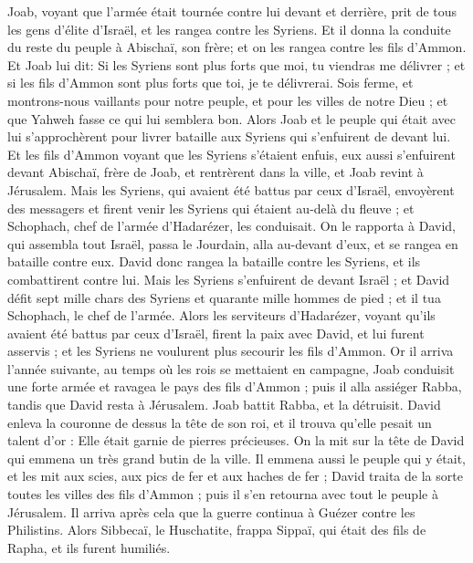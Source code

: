 \begin{multicols}{2}
Joab, voyant que l'armée était tournée contre lui devant et derrière, prit de tous les gens d'élite d'Israël, et les rangea contre les Syriens.
Et il donna la conduite du reste du peuple à Abischaï, son frère; et on les rangea contre les fils d’Ammon.
Et Joab lui dit: Si les Syriens sont plus forts que moi, tu viendras me délivrer ; et si les fils d'Ammon sont plus forts que toi, je te délivrerai.
Sois ferme, et montrons-nous vaillants pour notre peuple, et pour les villes de notre Dieu ; et que Yahweh fasse ce qui lui semblera bon.
Alors Joab et le peuple qui était avec lui s'approchèrent pour livrer bataille aux Syriens qui s'enfuirent de devant lui.
Et les fils d'Ammon voyant que les Syriens s'étaient enfuis, eux aussi s'enfuirent devant Abischaï, frère de Joab, et rentrèrent dans la ville, et Joab revint à Jérusalem.
Mais les Syriens, qui avaient été battus par ceux d'Israël, envoyèrent des messagers et firent venir les Syriens qui étaient au-delà du fleuve ; et Schophach, chef de l'armée d'Hadarézer, les conduisait.
On le rapporta à David, qui assembla tout Israël, passa le Jourdain, alla au-devant d'eux, et se rangea en bataille contre eux. David donc rangea la bataille contre les Syriens, et ils combattirent contre lui.
Mais les Syriens s'enfuirent de devant Israël ; et David défit sept mille chars des Syriens et quarante mille hommes de pied ; et il tua Schophach, le chef de l'armée.
Alors les serviteurs d'Hadarézer, voyant qu'ils avaient été battus par ceux d'Israël, firent la paix avec David, et lui furent asservis ; et les Syriens ne voulurent plus secourir les fils d’Ammon.
\VerseOne{}Or il arriva l’année suivante, au temps où les rois se mettaient en campagne, Joab conduisit une forte armée et ravagea le pays des fils d’Ammon ; puis il alla assiéger Rabba, tandis que David resta à Jérusalem. Joab battit Rabba, et la détruisit.
David enleva la couronne de dessus la tête de son roi, et il trouva qu'elle pesait un talent d'or : Elle était garnie de pierres précieuses. On la mit sur la tête de David qui emmena un très grand butin de la ville.
Il emmena aussi le peuple qui y était, et les mit aux scies, aux pics de fer et aux haches de fer ; David traita de la sorte toutes les villes des fils d’Ammon ; puis il s'en retourna avec tout le peuple à Jérusalem.
Il arriva après cela que la guerre continua à Guézer contre les Philistins. Alors Sibbecaï, le Huschatite, frappa Sippaï, qui était des fils de Rapha, et ils furent humiliés.

\end{multicols}
